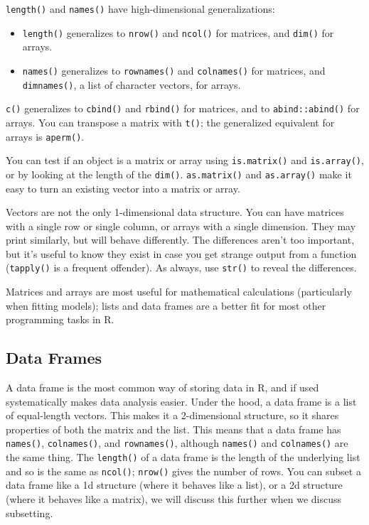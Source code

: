 \documentclass[]{book}
\theoremstyle{definition}
\theoremstyle{definition}
\theoremstyle{definition}
\theoremstyle{remark}
\begin{document}
\texttt{length()} and \texttt{names()} have high-dimensional
generalizations:

\begin{itemize}
\item
  \texttt{length()} generalizes to \texttt{nrow()} and \texttt{ncol()}
  for matrices, and \texttt{dim()} for arrays.
\item
  \texttt{names()} generalizes to \texttt{rownames()} and
  \texttt{colnames()} for matrices, and \texttt{dimnames()}, a list of
  character vectors, for arrays.
\end{itemize}

\texttt{c()} generalizes to \texttt{cbind()} and \texttt{rbind()} for
matrices, and to \texttt{abind::abind()} for arrays. You can transpose a
matrix with \texttt{t()}; the generalized equivalent for arrays is
\texttt{aperm()}.

You can test if an object is a matrix or array using
\texttt{is.matrix()} and \texttt{is.array()}, or by looking at the
length of the \texttt{dim()}. \texttt{as.matrix()} and
\texttt{as.array()} make it easy to turn an existing vector into a
matrix or array.

Vectors are not the only 1-dimensional data structure. You can have
matrices with a single row or single column, or arrays with a single
dimension. They may print similarly, but will behave differently. The
differences aren't too important, but it's useful to know they exist in
case you get strange output from a function (\texttt{tapply()} is a
frequent offender). As always, use \texttt{str()} to reveal the
differences.

Matrices and arrays are most useful for mathematical calculations
(particularly when fitting models); lists and data frames are a better
fit for most other programming tasks in R.

\subsection{Data Frames}\label{data-frames}

A data frame is the most common way of storing data in R, and if used
systematically makes data analysis easier. Under the hood, a data frame
is a list of equal-length vectors. This makes it a 2-dimensional
structure, so it shares properties of both the matrix and the list. This
means that a data frame has \texttt{names()}, \texttt{colnames()}, and
\texttt{rownames()}, although \texttt{names()} and \texttt{colnames()}
are the same thing. The \texttt{length()} of a data frame is the length
of the underlying list and so is the same as \texttt{ncol()};
\texttt{nrow()} gives the number of rows. You can subset a data frame
like a 1d structure (where it behaves like a list), or a 2d structure
(where it behaves like a matrix), we will discuss this further when we
discuss subsetting.
\end{document}
